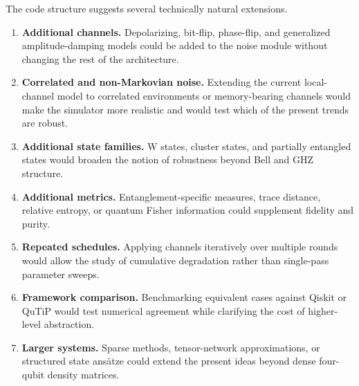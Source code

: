 The code structure suggests several technically natural extensions.
\begin{enumerate}
\item \textbf{Additional channels.} Depolarizing, bit-flip, phase-flip, and generalized amplitude-damping models could be added to the noise module without changing the rest of the architecture.
\item \textbf{Correlated and non-Markovian noise.} Extending the current local-channel model to correlated environments or memory-bearing channels would make the simulator more realistic and would test which of the present trends are robust.
\item \textbf{Additional state families.} W states, cluster states, and partially entangled states would broaden the notion of robustness beyond Bell and GHZ structure.
\item \textbf{Additional metrics.} Entanglement-specific measures, trace distance, relative entropy, or quantum Fisher information could supplement fidelity and purity.
\item \textbf{Repeated schedules.} Applying channels iteratively over multiple rounds would allow the study of cumulative degradation rather than single-pass parameter sweeps.
\item \textbf{Framework comparison.} Benchmarking equivalent cases against Qiskit or QuTiP would test numerical agreement while clarifying the cost of higher-level abstraction.
\item \textbf{Larger systems.} Sparse methods, tensor-network approximations, or structured state ans\"atze could extend the present ideas beyond dense four-qubit density matrices.
\end{enumerate}
